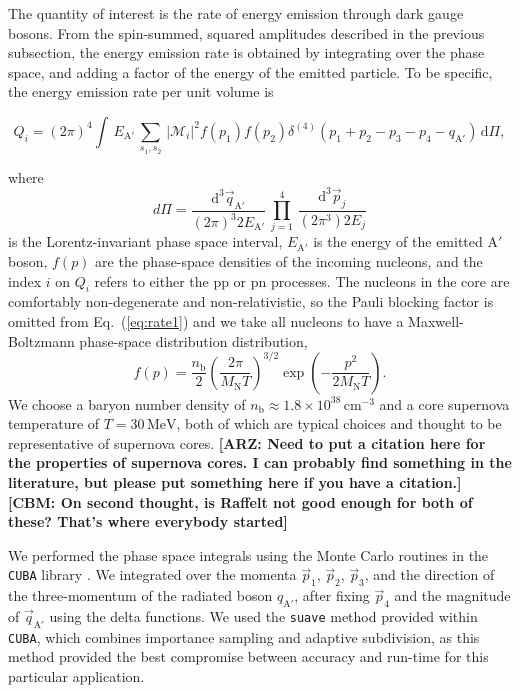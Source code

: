 \documentclass[nofootinbib,prd,superscriptaddress,twocolumn]{revtex4}
\newcommand{\beq}{\begin{equation}}
\newcommand{\eeq}{\end{equation}}
\newcommand{\qa}{q_{\mathrm{A}'}}
\newcommand{\Aprime}{\mathrm{A}'}
\newcommand{\dd}{\mathrm{d}}
\newcommand{\arz}[1]{{{\bf{\color{BrickRed}[ARZ: #1]}}}}
\newcommand{\cbm}[1]{{{\bf{\color{Green}[CBM: #1]}}}}
\begin{document}
The quantity of interest is the rate of energy emission through dark gauge bosons. 
From the spin-summed, squared amplitudes described in the previous subsection, 
the energy emission rate is obtained by integrating over the phase space, 
and adding a factor of the energy of the emitted particle. To be specific, the 
energy emission rate per unit volume is 
%
\begin{widetext}
\beq
\label{eq:rate1}
Q_i = (2\pi)^4 \int\, E_{\mathrm{A}'} \, \sum_{s_1,s_2}\, \vert \mathcal{M}_i \vert^2 f(p_1) f(p_2)\delta^{(4)}(p_1+p_2-p_3-p_4-\qa)\, \dd \Pi,
\eeq
\end{widetext}
%
where 
%
\begin{equation}
d\Pi = \frac{\dd^3 \vec{q}_{\mathrm{A}'}}{(2\pi)^3 2E_{\mathrm{A}'}}\, \prod_{j=1}^{4}\, \frac{\dd^3 \vec{p}_j}{(2\pi^3) 2E_j}
\end{equation} 
is the Lorentz-invariant phase space interval, 
$ E_{\mathrm{A}'}$ is the energy of the emitted $\Aprime$ boson, 
$f(p)$ are the phase-space densities of the incoming nucleons, and 
the index $i$ on $Q_i$ refers to either the pp or pn processes. 
The nucleons in the core are comfortably non-degenerate and non-relativistic, 
so the Pauli blocking factor is omitted from Eq.~(\ref{eq:rate1}) and we take 
all nucleons to have a Maxwell-Boltzmann phase-space distribution distribution, 
\beq
f(p) =  \frac{n_{\mathrm{b}}}{2} \left( \frac{2 \pi}{M_{\mathrm{N}} T} \right)^{3/2} \exp \left(-\frac{p^2}{2 M_{\mathrm{N}} T} \right).
\eeq
%
We choose a baryon number density of $n_{\mathrm{b}} \approx 1.8 \times 10^{38}\, \mathrm{cm}^{-3}$ and a 
core supernova temperature of $T = 30\, \mathrm{MeV}$, both of which are typical choices and thought to 
be representative of supernova cores. \arz{Need to put a citation here for the properties of supernova cores. 
I can probably find something in the literature, but please put something here if you have a citation.} \cbm{On second thought, is Raffelt not good enough for both of these? That's where everybody started}


We performed the phase space integrals using the Monte Carlo routines in the {\tt CUBA} library \cite{Hahn:2004fe}.
We integrated over the momenta $\vec{p}_1$, $\vec{p}_2$, $\vec{p}_3$, and the direction of the 
three-momentum of the radiated boson $\hat{q}_{\mathrm{A}'}$, after fixing $\vec{p}_4$ 
and the magnitude of $\vec{q}_{\mathrm{A}'}$ using the delta functions.
 We used the {\tt suave} method provided within {\tt CUBA}, which combines 
importance sampling and adaptive subdivision, as this method provided the best compromise 
between accuracy and run-time for this particular application.
\end{document}

